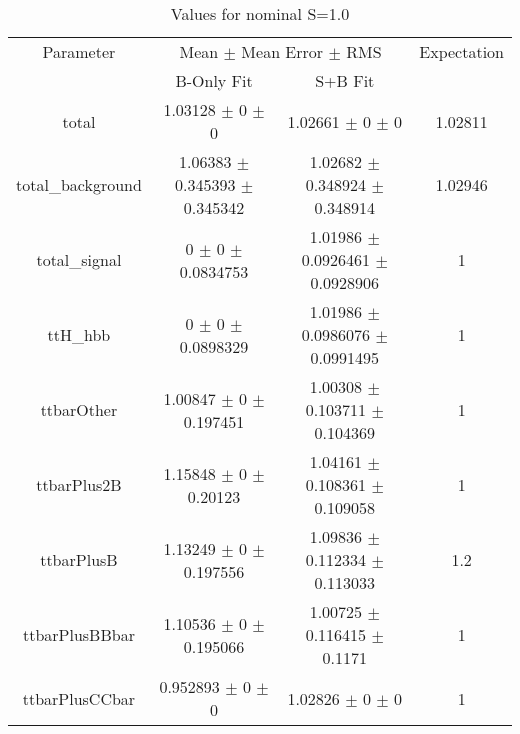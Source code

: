 \begin{table}
\centering
\caption{Values for nominal S=1.0}
\begin{tabular}{cccc}
\toprule
Parameter & \multicolumn{2}{c}{Mean $\pm$ Mean Error $\pm$ RMS} & Expectation\\
 & B-Only Fit & S+B Fit & \\
\midrule
total & \num{1.03128} $\pm$ \num{0} $\pm$ \num{0} & \num{1.02661} $\pm$ \num{0} $\pm$ \num{0} & \num{1.02811}\\
total\_background & \num{1.06383} $\pm$ \num{0.345393} $\pm$ \num{0.345342} & \num{1.02682} $\pm$ \num{0.348924} $\pm$ \num{0.348914} & \num{1.02946}\\
total\_signal & \num{0} $\pm$ \num{0} $\pm$ \num{0.0834753} & \num{1.01986} $\pm$ \num{0.0926461} $\pm$ \num{0.0928906} & \num{1}\\
ttH\_hbb & \num{0} $\pm$ \num{0} $\pm$ \num{0.0898329} & \num{1.01986} $\pm$ \num{0.0986076} $\pm$ \num{0.0991495} & \num{1}\\
ttbarOther & \num{1.00847} $\pm$ \num{0} $\pm$ \num{0.197451} & \num{1.00308} $\pm$ \num{0.103711} $\pm$ \num{0.104369} & \num{1}\\
ttbarPlus2B & \num{1.15848} $\pm$ \num{0} $\pm$ \num{0.20123} & \num{1.04161} $\pm$ \num{0.108361} $\pm$ \num{0.109058} & \num{1}\\
ttbarPlusB & \num{1.13249} $\pm$ \num{0} $\pm$ \num{0.197556} & \num{1.09836} $\pm$ \num{0.112334} $\pm$ \num{0.113033} & \num{1.2}\\
ttbarPlusBBbar & \num{1.10536} $\pm$ \num{0} $\pm$ \num{0.195066} & \num{1.00725} $\pm$ \num{0.116415} $\pm$ \num{0.1171} & \num{1}\\
ttbarPlusCCbar & \num{0.952893} $\pm$ \num{0} $\pm$ \num{0} & \num{1.02826} $\pm$ \num{0} $\pm$ \num{0} & \num{1}\\
\bottomrule
\end{tabular}
\end{table}